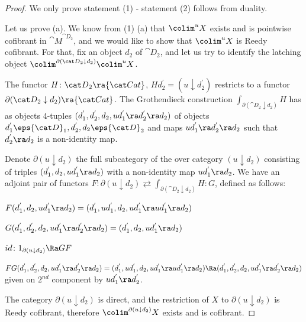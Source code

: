 \begin{proof}
We only prove statement (1) - statement (2) follows from duality.

Let us prove (a). We know from  (1) (a) that $\colim^u X$ exists and is pointwise cofibrant in ${\cat M}^{{\cat D}_2}$, and we would like to show that $\colim^u X$ is Reedy cofibrant. For that, fix an object $d_2$ of ${\cat D}_2$, and let us try to identify the latching object $\colim^{\partial({\cat D}_2 \downarrow d_2)} \colim^u X$.

The functor $H \colon {\cat D}_2 \ra {\cat Cat}$, $Hd_2^{'} = (u \downarrow d_2^{'})$ restricts to a functor $\partial({\cat D}_2 \downarrow d_2) \ra {\cat Cat}$. The Grothendieck construction $\int_{\partial({\cat D}_2 \downarrow d_2)} {H}$ has as objects 4-tuples $(d_1^{'}, d_2^{'}, d_2, ud_1^{'} \ra d_2^{'} \ra d_2)$ of objects $d_1^{'} \eps {\cat D}_1, d_2^{'}, d_2 \eps {\cat D}_2$ and maps $ud_1^{'} \ra d_2^{'} \ra d_2$ such that $d_2^{'} \ra d_2$ is a non-identity map. 

Denote $\partial(u \downarrow d_2)$ the full subcategory of the over category $(u \downarrow d_2)$ consisting of triples $(d_1^{'}, d_2, ud_1^{'} \ra d_2)$ with a non-identity map $ud_1^{'} \ra d_2$. We have an adjoint pair of functors $F : \partial(u \downarrow d_2) \rightleftarrows \int_{\partial({\cat D}_2 \downarrow d_2)} {H} : G$, defined as follows:
\begin{center}
$F(d_1^{'}, d_2, ud_1^{'} \ra d_2) = (d_1^{'}, ud_1^{'}, d_2, ud_1^{'} \ra ud_1^{'} \ra d_2)$
\end{center}
\begin{center}
$G(d_1^{'}, d_2^{'}, d_2, ud_1^{'} \ra d_2^{'} \ra d_2) = (d_1^{'}, d_2, ud_1^{'} \ra d_2)$
\end{center}
\begin{center}
$id \colon 1_{\partial(u \downarrow d_2)} \Ra GF$
\end{center}
\begin{center}
$FG(d_1^{'}, d_2^{'}, d_2, ud_1^{'} \ra d_2^{'} \ra d_2) = (d_1^{'}, ud_1^{'}, d_2, ud_1^{'} \ra ud_1^{'} \ra d_2) \Ra (d_1^{'}, d_2^{'}, d_2, ud_1^{'} \ra d_2^{'} \ra d_2)$ given on $2^{nd}$ component by $ud_1^{'} \ra d_2^{'}$.
\end{center}
The category $\partial(u \downarrow d_2)$ is direct, and the restriction of $X$ to $\partial(u \downarrow d_2)$ is Reedy cofibrant, therefore $\colim^{\partial(u \downarrow d_2)} X$ exists and is cofibrant. 


\end{proof}
